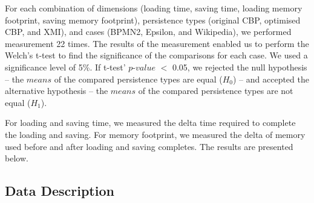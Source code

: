 \documentclass{llncs}
\begin{document}
{    For each combination of dimensions (loading time, saving time, loading memory footprint, saving memory footprint),  persistence types (original CBP, optimised CBP, and XMI), and cases (BPMN2, Epsilon, and Wikipedia), we performed measurement 22 times. The results of the measurement enabled us to perform the Welch's t-test \cite{welch1947ttest} to find the significance of the comparisons for each case. We used a significance level of 5\%. If t-test' $p$-$value$ $<$ 0.05, we rejected the null hypothesis -- the $means$ of the compared persistence types are equal ($H_0$) -- and accepted the alternative hypothesis -- the $means$ of the compared persistence types are not equal ($H_1$).
    
     For loading and saving time, we measured the delta time required to complete the loading and saving. For memory footprint, we measured the delta of memory used before and after loading and saving completes. The results are presented below.

\vspace{-10pt}
\subsection{Data Description}
\label{subsec:data_description}

}
\end{document}
